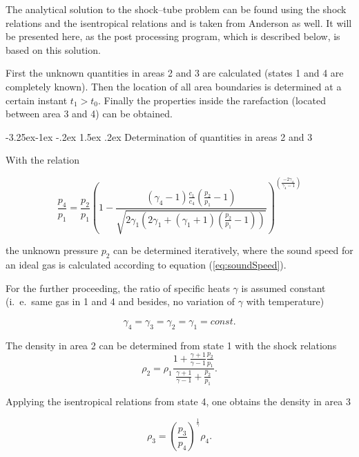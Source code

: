 \documentclass{report}
\makeatletter
\renewcommand\paragraph{\@startsection{paragraph}{4}{\z@}%
  {-3.25ex\@plus -1ex \@minus -.2ex}%
  {1.5ex \@plus .2ex}%
  {\normalfont\normalsize\bfseries}}
\makeatother
\begin{document}
The analytical solution to the shock--tube problem can be found using the shock relations and the isentropical relations and is taken from Anderson \cite{Anderson2002} as well. 
It will be presented here, as the post processing program, which is described below, is based on this solution.

First the unknown quantities in areas 2 and 3 are calculated (states 1 and 4 are completely known). Then the location of all area boundaries is determined at a certain instant $t_1>t_0$. Finally the properties inside the rarefaction (located between area 3 and 4) can be obtained.

\paragraph{Determination of quantities in areas 2 and 3}

With the relation

\begin{equation}
 \frac{p_4}{p_1} = \frac{p_2}{p_1}  \left(1-\frac{(\gamma_4-1)\frac{c_1}{c_4}\left(\frac{p_2}{p_1}-1\right)}{\sqrt{2\gamma_1\left(2 \gamma_1+(\gamma_1+1)\left(\frac{p_2}{p_1}-1\right)\right)}}\right)^{\left(\frac{-2 \gamma_4}{\gamma_4-1}\right)}
\end{equation}

 the unknown pressure $p_2$ can be determined iteratively, where the sound speed for an ideal gas is calculated according to equation (\ref{eq:soundSpeed}). 

For the further proceeding, the ratio of specific heats $\gamma$ is assumed constant (i.\ e.\ same gas in 1 and 4 and besides, no variation of $\gamma$ with temperature)

\begin{equation}
 \gamma_4= \gamma_3= \gamma_2= \gamma_1=const.
\end{equation}

The density in area 2 can be determined from state 1 with the shock relations 
\begin{equation}
 \rho_2=\rho_1\frac{1+\frac{\gamma+1}{\gamma-1}\frac{p_2}{p_1}}{\frac{\gamma+1}{\gamma-1}+\frac{p_2}{p_1}}.
\end{equation}

Applying the isentropical relations from state 4, one obtains the density in area 3

\begin{equation}
\rho_3=\left(\frac{p_3}{p_4}\right)^{\frac{1}{\gamma}}\rho_4.
\end{equation}
\end{document}
